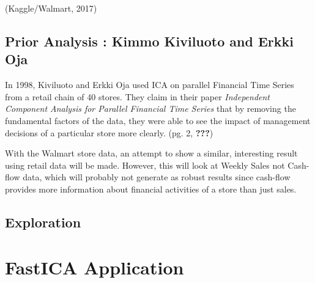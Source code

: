 \documentclass[12pt,twoside]{amherstthesis}
\begin{document}
  (Kaggle/Walmart, 2017)
  
  \subsection{Prior Analysis : Kimmo Kiviluoto and Erkki
  Oja}\label{prior-analysis-kimmo-kiviluoto-and-erkki-oja}
  
  In 1998, Kiviluoto and Erkki Oja used ICA on parallel Financial Time
  Series from a retail chain of 40 stores. They claim in their paper
  \textit{Independent Component Analysis for Parallel Financial Time Series}
  that by removing the fundamental factors of the data, they were able to
  see the impact of management decisions of a particular store more
  clearly. (pg. 2, {\textbf{???}})
  
  With the Walmart store data, an attempt to show a similar, interesting
  result using retail data will be made. However, this will look at Weekly
  Sales not Cash-flow data, which will probably not generate as robust
  results since cash-flow provides more information about financial
  activities of a store than just sales.
  
  \subsection{Exploration}\label{exploration}
  
  \section{FastICA Application}\label{fastica-application}
  
  \begin{Shaded}
  \end{Shaded}
  
\end{document}
